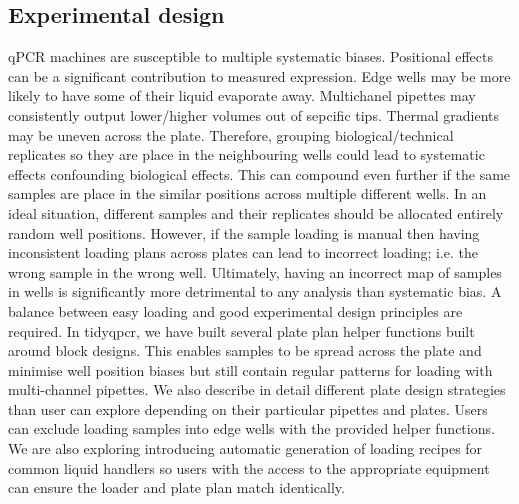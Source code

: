 \documentclass{SBCbookchapter}
\begin{document}
\subsection{Experimental design}

qPCR machines are susceptible to multiple systematic biases. Positional effects can be a significant contribution to measured expression. Edge wells may be more likely to have some of their liquid evaporate away. Multichanel pipettes may consistently output lower/higher volumes out of sepcific tips. Thermal gradients may be uneven across the plate. Therefore, grouping biological/technical replicates so they are place in the neighbouring wells could lead to systematic effects confounding biological effects. This can compound even further if the same samples are place in the similar positions across multiple different wells. In an ideal situation, different samples and their replicates should be allocated entirely random well positions. However, if the sample loading is manual then having inconsistent loading plans across plates can lead to incorrect loading; i.e. the wrong sample in the wrong well. Ultimately, having an incorrect map of samples in wells is significantly more detrimental to any analysis than systematic bias. A balance between easy loading and good experimental design principles are required. In tidyqpcr, we have built several plate plan helper functions built around block designs. This enables samples to be spread across the plate and minimise well position biases but still contain regular patterns for loading with multi-channel pipettes. We also describe in detail different plate design strategies than user can explore depending on their particular pipettes and plates. Users can exclude loading samples into edge wells with the provided helper functions. We are also exploring introducing automatic generation of loading recipes for common liquid handlers so users with the access to the appropriate equipment can ensure the loader and plate plan match identically.
\end{document}
